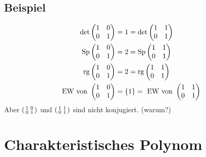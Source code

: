 \subsection[Beispiel zweier Matrizen, die alle Kriterien erfüllen, aber nicht konjugiert sind]{Beispiel} %
\label{sub:57}
\begin{align*}
	\det \begin{pmatrix}
		1 & 0 \\
		0 & 1			
	\end{pmatrix} &= 1 = \det \begin{pmatrix}
		1 & 1 \\
		0 & 1
	\end{pmatrix} \\
	\operatorname{Sp} \begin{pmatrix}
		1 & 0 \\
		0 & 1			
	\end{pmatrix} &= 2 = \operatorname{Sp} \begin{pmatrix}
		1 & 1 \\
		0 & 1
	\end{pmatrix} \\
	\operatorname{rg} {\begin{pmatrix}
		1 & 0 \\
		0 & 1			
	\end{pmatrix}} &= 2 = \operatorname{rg} {\begin{pmatrix}
		1 & 1 \\
		0 & 1
	\end{pmatrix}} \\
	\text{EW von }  \begin{pmatrix}
		1 & 0 \\
		0 & 1			
	\end{pmatrix} &= \{1\} = \text{ EW von } \begin{pmatrix}
		1 & 1 \\
		0 & 1
	\end{pmatrix}
\end{align*}
Aber $(\begin{smallmatrix}1  &  0\\  0 & 1  \end{smallmatrix})$ und $(\begin{smallmatrix}1  & 1 \\  0 & 1  \end{smallmatrix})$ sind nicht konjugiert. 
(warum?)
\newpage

\section{Charakteristisches Polynom} %
\label{sec:6}

